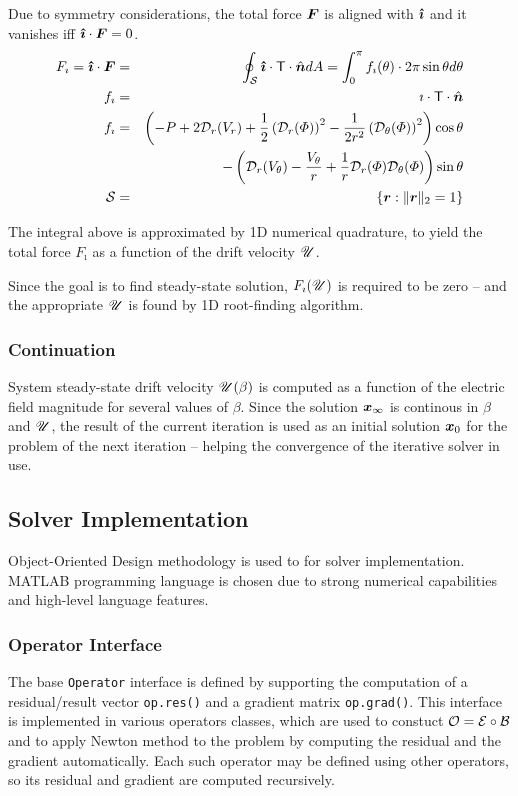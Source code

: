 Due to symmetry considerations, the total force $\boldsymbol{F}$ is 
aligned with $\boldsymbol{\hat{\imath}}$ and it vanishes iff $\boldsymbol{\hat{\imath}} \cdot \boldsymbol{F} = 0$.
\begin{eqnarray}
F_\imath = \boldsymbol{\hat{\imath}} \cdot \boldsymbol{F} &=& \oint_\mathcal{S} \boldsymbol{\hat{\imath}} \cdot \mathsf{T} \cdot \hat{\boldsymbol{n}}  dA = 
\int_0^\pi f_\imath(\theta) \cdot 2\pi \sin\theta d\theta 
\\  
f_\imath &=& \imath \cdot \mathsf{T} \cdot \hat{\boldsymbol{n}}
\\  
f_\imath &=& \left(-P + 2\mathcal{D}_r(V_r) + 
\frac{1}{2}\left(\mathcal{D}_r(\varPhi)\right)^2 - \frac{1}{2r^2}\left(\mathcal{D}_\theta(\varPhi)\right)^2\right)\cos\theta 
\\  
&& -\left(\mathcal{D}_r(V_\theta) - \frac{V_\theta}{r}
+ \frac{1}{r}\mathcal{D}_r(\varPhi) \mathcal{D}_{\theta}(\varPhi)\right)\sin\theta \\
 \mathcal{S} &=& \{\boldsymbol{r} : \|\boldsymbol{r}\|_2 = 1\}
\end{eqnarray}

The integral above is approximated by 1D numerical quadrature, to yield 
the total force $F_\imath$ as a function of the drift velocity $\mathscr{U}$.

Since the goal is to find steady-state solution, $F_\imath(\mathscr{U})$ is required to be zero --
and the appropriate $\mathscr{U}$ is found by 1D root-finding algorithm.

\subsubsection{Continuation}

System steady-state drift velocity $\mathscr{U}(\beta)$ is computed as a function 
of the electric field magnitude for several values of $\beta$.
Since the solution $\boldsymbol{x}_\infty$ is continous in $\beta$ and $\mathscr{U}$, 
the result of the current iteration is used as an initial solution $\boldsymbol{x}_0$ for the problem 
of the next iteration -- helping the convergence of the iterative solver in use.

\subsection{Solver Implementation}

Object-Oriented Design methodology is used to for solver implementation.
MATLAB programming language is chosen due to strong numerical capabilities
and high-level language features.

\subsubsection{Operator Interface}
The base \verb|Operator| interface is defined by 
supporting the computation of a residual/result vector \verb|op.res()|
and a gradient matrix \verb|op.grad()|.
This interface is implemented in various operators classes,
which are used to constuct $\mathcal{O} = \mathcal{E} \circ \mathcal{B}$ and to apply Newton method
to the problem by computing the residual and the gradient automatically.
Each such operator may be defined using other operators, so its residual
and gradient are computed recursively.

